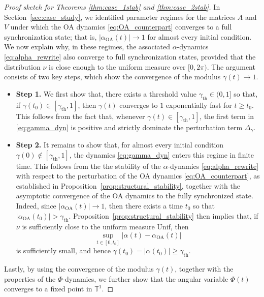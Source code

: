 \documentclass[10pt]{article}
\theoremstyle{definition}
\theoremstyle{definition}
\numberwithin{equation}{section}
\newcommand{\BBT}{\mathbb{T}}
\newcommand{\gammaTH}{\gamma_{\mathrm{th}}}
\newcommand{\Unif}{\mathrm{Unif}}
\newcommand{\OA}{\mathrm{OA}}
\begin{document}
\begin{proof}[Proof sketch for Theorems \ref{thm:case_1stab} and \ref{thm:case_2stab}]

In Section~\ref{sec:case_study}, we identified parameter regimes for the matrices $A$ and $V$ under which the OA dynamics \eqref{eq:OA_counterpart} converges to a full synchronization state; that is, $|\alpha_{\OA}(t)| \rightarrow 1$ for almost every initial condition. We now explain why, in these regimes, the associated $\alpha$-dynamics \eqref{eq:alpha_rewrite} also converge to full synchronization states, provided that the distribution $\nu$ is close enough to the uniform measure over $[0,2\pi)$. 
The argument consists of two key steps, which show the convergence of the modulus $\gamma(t) \rightarrow 1$.

\begin{itemize}
    \item \textbf{Step 1.}
    We first show that, there exists a threshold value $\gammaTH \in (0,1]$ so that, if $\gamma(t_0) \in [\gammaTH, 1]$, then $\gamma(t)$ converges to $1$ exponentially fast for $t \geq t_0$.
    This follows from the fact that, whenever $\gamma(t) \in [\gammaTH, 1]$, the first term in \eqref{eq:gamma_dyn} is positive and strictly dominate the perturbation term $\Delta_{\gamma}$.

    \item \textbf{Step 2.}
    It remains to show that, for almost every initial condition $\gamma(0) \notin [\gammaTH, 1]$, the dynamics \eqref{eq:gamma_dyn} enters this regime in finite time.
    This follows from the the stability of the $\alpha$-dynamics \eqref{eq:alpha_rewrite} with respect to the perturbation of the OA dynamics \eqref{eq:OA_counterpart}, as established in Proposition~\ref{prop:structural_stability}, together with the asymptotic convergence of the OA dynamics to the fully synchronized state.
    Indeed, since $|\alpha_{\OA} (t)| \rightarrow 1$, then there exists a time $t_0$ so that $|\alpha_{\OA} (t_0)| > \gammaTH$.
    Proposition~\ref{prop:structural_stability} then implies that, if $\nu$ is sufficiently close to the uniform measure $\Unif$, then
    $$\sup_{t \in [0,t_0]} \left| \alpha(t) - \alpha_{\OA}(t) \right|$$
    is sufficiently small, and hence $\gamma(t_0) = |\alpha (t_0)| \geq \gammaTH$.
\end{itemize}

Lastly, by using the convergence of the modulus $\gamma(t)$, together with the properties of the $\Phi$-dynamics, we further show that the angular variable $\Phi(t)$ converges to a fixed point in $\BBT^1$. 
\end{proof}
\end{document}
